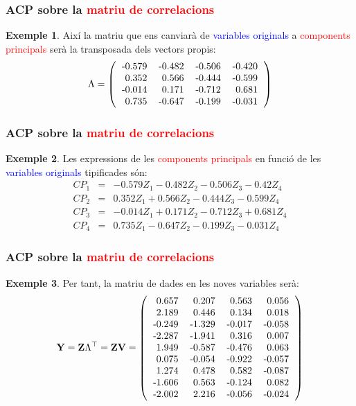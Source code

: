 \documentclass[12pt,t]{beamer}
\newcommand{\red}[1]{\textcolor{red}{#1}}
\newcommand{\blue}[1]{\textcolor{blue}{#1}}
\theoremstyle{plain}
\theoremstyle{definition}
\newtheorem{exemple}{Exemple}
\begin{document}
\begin{frame}
\frametitle{ACP sobre la \red{matriu de correlacions}}
\begin{exemple}
{
Així la matriu que ens canviarà de \blue{variables originals} a \red{components principals} serà la transposada dels vectors propis:
\[
\Lambda=
\left(
\begin{tabular}{rrrr}
  -0.579 & -0.482 & -0.506 & -0.420 \\ 
  0.352 & 0.566 & -0.444 & -0.599 \\ 
  -0.014 & 0.171 & -0.712 & 0.681 \\ 
  0.735 & -0.647 & -0.199 & -0.031 \\ 
  \end{tabular}\right)
\]
}
\end{exemple}
\end{frame}


\begin{frame}
\frametitle{ACP sobre la \red{matriu de correlacions}}
\begin{exemple}
Les expressions de les \red{components principals} en funció de les \blue{variables originals} tipificades són:
\begin{eqnarray*}
CP_1 &=& -0.579Z_1 
-0.482Z_2
-0.506Z_3 
-0.42Z_4
\\
CP_2 &=& 0.352Z_1
+0.566Z_2
-0.444Z_3 
-0.599Z_4
\\
CP_3 &=& -0.014Z_1
+0.171Z_2
-0.712Z_3 
+0.681Z_4 \\
CP_4 &=& 0.735Z_1
-0.647Z_2
-0.199Z_3 
-0.031Z_4
\end{eqnarray*}
\end{exemple}
\end{frame}

\begin{frame}
\frametitle{ACP sobre la \red{matriu de correlacions}}
\begin{exemple}
{\small
Per tant, la matriu de dades en les noves variables serà:
\[
\mathbf{Y}={\mathbf{Z}}\Lambda^\top = {\mathbf{Z}}\mathbf{V}=
\left(
\begin{tabular}{rrrr}
  0.657 & 0.207 & 0.563 & 0.056 \\ 
  2.189 & 0.446 & 0.134 & 0.018 \\ 
  -0.249 & -1.329 & -0.017 & -0.058 \\ 
  -2.287 & -1.941 & 0.316 & 0.007 \\ 
  1.949 & -0.587 & -0.476 & 0.063 \\ 
  0.075 & -0.054 & -0.922 & -0.057 \\ 
  1.274 & 0.478 & 0.582 & -0.087 \\ 
  -1.606 & 0.563 & -0.124 & 0.082 \\ 
  -2.002 & 2.216 & -0.056 & -0.024 \\ 
  \end{tabular}\right)
\]
}
\end{exemple}
\end{frame}
\end{document}
